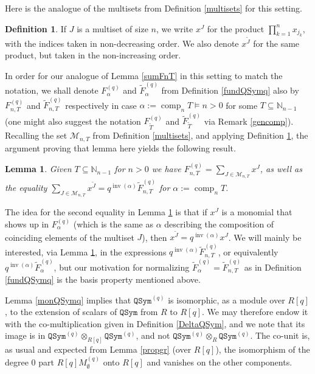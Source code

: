 \documentclass{article}
\newtheorem{lem}[thm]{Lemma}
\theoremstyle{definition}
\newtheorem{defn}[thm]{Definition}
\begin{document}
Here is the analogue of the multisets from Definition \ref{multisets} for this setting.
\begin{defn}
If $J$ is a multiset of size $n$, we write $x^{J}$ for the product $\prod_{k=1}^{n}x_{j_{k}}$, with the indices taken in non-decreasing order. We also denote $x^{\tilde{J}}$ for the same product, but taken in the non-increasing order. \label{multq}
\end{defn}
In order for our analogue of Lemma \ref{sumFnT} in this setting to match the notation, we shall denote $F_{\alpha}^{(q)}$ and $\widetilde{F}_{\alpha}^{(q)}$ from Definition \ref{fundQSymq} also by $F_{n,T}^{(q)}$ and $\widetilde{F}_{n,T}^{(q)}$ respectively in case $\alpha:=\operatorname{comp}_{n}T \vDash n>0$ for some $T\subseteq\mathbb{N}_{n-1}$ (one might also suggest the notation $F_{\tilde{T}}^{(q)}$ and $\widetilde{F}_{\tilde{T}}^{(q)}$ via Remark \ref{gencomp}). Recalling the set $\mathcal{M}_{n,T}$ from Definition \ref{multisets}, and applying Definition \ref{multq}, the argument proving that lemma here yields the following result.
\begin{lem}
Given $T\subseteq\mathbb{N}_{n-1}$ for $n>0$ we have $F_{n,T}^{(q)}=\sum_{J\in\mathcal{M}_{n,T}}x^{J}$, as well as the equality $\sum_{J\in\mathcal{M}_{n,T}}x^{\tilde{J}}=q^{\operatorname{inv}(\alpha)}\widetilde{F}_{n,T}^{(q)}$ for $\alpha:=\operatorname{comp}_{n}T$. \label{sumFnTq}
\end{lem}
The idea for the second equality in Lemma \ref{sumFnTq} is that if $x^{J}$ is a monomial that shows up in $F_{\alpha}^{(q)}$ (which is the same as $\alpha$ describing the composition of coinciding elements of the multiset $J$), then $x^{\tilde{J}}=q^{\operatorname{inv}(\alpha)}x^{J}$. We will mainly be interested, via Lemma \ref{sumFnTq}, in the expressions $q^{\operatorname{inv}(\alpha)}\widetilde{F}_{n,T}^{(q)}$, or equivalently $q^{\operatorname{inv}(\alpha)}\widetilde{F}_{\alpha}^{(q)}$, but our motivation for normalizing $\widetilde{F}_{\alpha}^{(q)}=\widetilde{F}_{n,T}^{(q)}$ as in Definition \ref{fundQSymq} is the basis property mentioned above.

\medskip

Lemma \ref{monQSymq} implies that $\mathtt{QSym}^{(q)}$ is isomorphic, as a module over $R[q]$, to the extension of scalars of $\mathtt{QSym}$ from $R$ to $R[q]$. We may therefore endow it with the co-multiplication given in Definition \ref{DeltaQSym}, and we note that its image is in $\mathtt{QSym}^{(q)}\otimes_{R[q]}\mathtt{QSym}^{(q)}$, and not $\mathtt{QSym}^{(q)}\otimes_{R}\mathtt{QSym}^{(q)}$. The co-unit is, as usual and expected from Lemma \ref{propgr} (over $R[q]$), the isomorphism of the degree 0 part $R[q]M_{\emptyset}^{(q)}$ onto $R[q]$ and vanishes on the other components.
\end{document}
